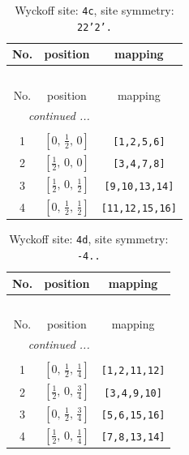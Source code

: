\documentclass[fleqn,8pt]{jsarticle}
\begin{document}
\renewcommand{\arraystretch}{1.2}
\begin{longtable}{ccc}
\caption{Wyckoff site: {\tt 4c}, site symmetry: {\tt 22'2'.}}
 \\
 \hline \hline
No. & position & mapping \\ \hline \endfirsthead

\multicolumn{2}{l}{\tablename\ \thetable{}} \\
 \hline \hline
No. & position & mapping \\ \hline \endhead

 \hline \hline
\multicolumn{2}{r}{\footnotesize\it continued ...} \\ \endfoot

 \hline \hline
\multicolumn{2}{r}{} \\ \endlastfoot

1 & $\left[ 0,\, \frac{1}{2},\, 0 \right]$ & {\tt [1,2,5,6]} \\ \hline
2 & $\left[ \frac{1}{2},\, 0,\, 0 \right]$ & {\tt [3,4,7,8]} \\ \hline
3 & $\left[ \frac{1}{2},\, 0,\, \frac{1}{2} \right]$ & {\tt [9,10,13,14]} \\ \hline
4 & $\left[ 0,\, \frac{1}{2},\, \frac{1}{2} \right]$ & {\tt [11,12,15,16]} \\
\end{longtable}
\renewcommand{\arraystretch}{1.2}
\begin{longtable}{ccc}
\caption{Wyckoff site: {\tt 4d}, site symmetry: {\tt -4..}}
 \\
 \hline \hline
No. & position & mapping \\ \hline \endfirsthead

\multicolumn{2}{l}{\tablename\ \thetable{}} \\
 \hline \hline
No. & position & mapping \\ \hline \endhead

 \hline \hline
\multicolumn{2}{r}{\footnotesize\it continued ...} \\ \endfoot

 \hline \hline
\multicolumn{2}{r}{} \\ \endlastfoot

1 & $\left[ 0,\, \frac{1}{2},\, \frac{1}{4} \right]$ & {\tt [1,2,11,12]} \\ \hline
2 & $\left[ \frac{1}{2},\, 0,\, \frac{3}{4} \right]$ & {\tt [3,4,9,10]} \\ \hline
3 & $\left[ 0,\, \frac{1}{2},\, \frac{3}{4} \right]$ & {\tt [5,6,15,16]} \\ \hline
4 & $\left[ \frac{1}{2},\, 0,\, \frac{1}{4} \right]$ & {\tt [7,8,13,14]} \\
\end{longtable}
\end{document}
